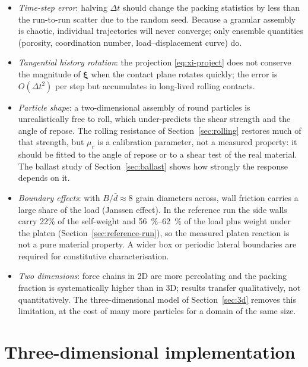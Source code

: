 \begin{itemize}[leftmargin=1.6em]
  \item \emph{Time-step error}: halving $\Delta t$ should change the packing
        statistics by less than the run-to-run scatter due to the random seed.
        Because a granular assembly is chaotic, individual trajectories will
        never converge; only ensemble quantities (porosity, coordination number,
        load--displacement curve) do.
  \item \emph{Tangential history rotation}: the projection
        \eqref{eq:xi-project} does not conserve the magnitude of
        $\boldsymbol{\xi}$ when the contact plane rotates quickly; the error is
        $O(\Delta t^{2})$ per step but accumulates in long-lived rolling
        contacts.
  \item \emph{Particle shape}: a two-dimensional assembly of round particles
        is unrealistically free to roll, which under-predicts the shear
        strength and the angle of repose.  The rolling resistance of
        Section~\ref{sec:rolling} restores much of that strength, but
        $\mu_{r}$ is a calibration parameter, not a measured property: it
        should be fitted to the angle of repose or to a shear test of the
        real material.  The ballast study of
        Section~\ref{sec:ballast} shows how strongly the response depends on
        it.
  \item \emph{Boundary effects}: with $B/\bar{d}\approx 8$ grain diameters
        across, wall friction carries a large share of the load (Janssen
        effect).  In the reference run the side walls carry \num{22}\% of the
        self-weight and \qtyrange{56}{62}{\percent} of the load plus weight
        under the platen (Section~\ref{sec:reference-run}), so the measured
        platen reaction is not a pure material property.  A wider box or periodic lateral boundaries are
        required for constitutive characterisation.
  \item \emph{Two dimensions}: force chains in 2D are more percolating and the
        packing fraction is systematically higher than in 3D; results transfer
        qualitatively, not quantitatively.
        The three-dimensional model of Section~\ref{sec:3d} removes this limitation, at the cost of many more particles for a domain of the same size.
\end{itemize}

\section{Three-dimensional implementation}
\label{sec:3d-numerics}

